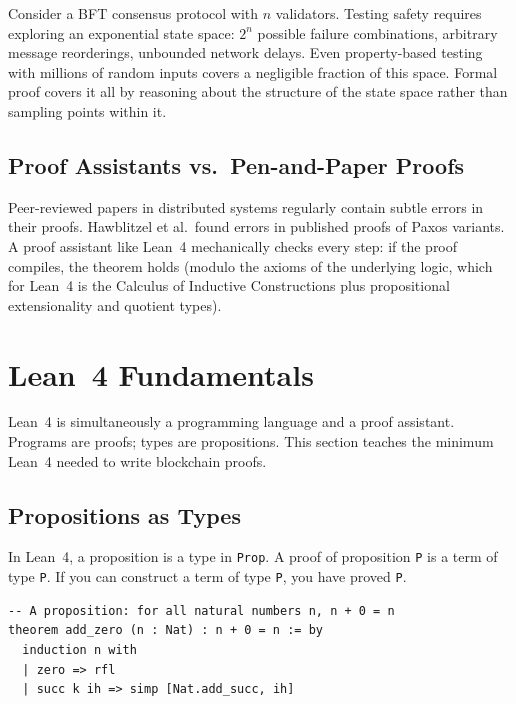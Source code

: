 \documentclass[11pt,a4paper]{article}
\begin{document}
Consider a BFT consensus protocol with $n$ validators. Testing safety requires exploring
an exponential state space: $2^n$ possible failure combinations, arbitrary message
reorderings, unbounded network delays. Even property-based testing with millions of random
inputs covers a negligible fraction of this space. Formal proof covers it all by reasoning
about the structure of the state space rather than sampling points within it.

\subsection{Proof Assistants vs.\ Pen-and-Paper Proofs}

Peer-reviewed papers in distributed systems regularly contain subtle errors in their proofs.
Hawblitzel et al.\ found errors in published proofs of Paxos variants. A proof assistant
like Lean~4 mechanically checks every step: if the proof compiles, the theorem holds
(modulo the axioms of the underlying logic, which for Lean~4 is the Calculus of Inductive
Constructions plus propositional extensionality and quotient types).

\section{Lean~4 Fundamentals}

Lean~4 is simultaneously a programming language and a proof assistant. Programs are
proofs; types are propositions. This section teaches the minimum Lean~4 needed to write
blockchain proofs.

\subsection{Propositions as Types}

In Lean~4, a proposition is a type in \texttt{Prop}. A proof of proposition \texttt{P}
is a term of type \texttt{P}. If you can construct a term of type \texttt{P}, you have
proved \texttt{P}.

\begin{lstlisting}[language=Lean,caption={Basic propositions in Lean~4}]
-- A proposition: for all natural numbers n, n + 0 = n
theorem add_zero (n : Nat) : n + 0 = n := by
  induction n with
  | zero => rfl
  | succ k ih => simp [Nat.add_succ, ih]
\end{lstlisting}
\end{document}
